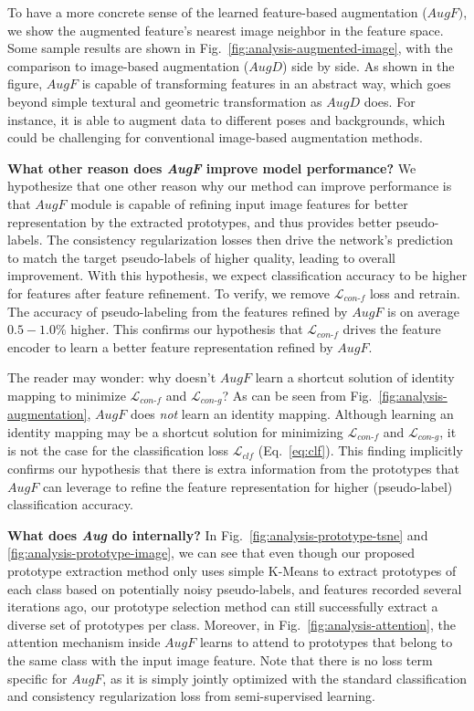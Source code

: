 \documentclass[runningheads]{llncs}
\begin{document}
To have a more concrete sense of the learned feature-based augmentation ($AugF)$, we show the augmented feature's nearest image neighbor in the feature space.
Some sample results are shown in Fig.~\ref{fig:analysis-augmented-image}, with the comparison to image-based augmentation ($AugD$) side by side.
As shown in the figure, $AugF$ is capable of transforming features in an abstract way, which goes beyond simple textural and geometric transformation as $AugD$ does.
For instance, it is able to augment data to different poses and backgrounds, which could be challenging for conventional image-based augmentation methods.

\noindent
\textbf{What other reason does \textit{AugF} improve model performance?}
We hypothesize that one other reason why our method can improve performance is that $AugF$ module is capable of refining input image features for better representation by the extracted prototypes, and thus provides better pseudo-labels.
The consistency regularization losses then drive the network's prediction to match the target pseudo-labels of higher quality, leading to overall improvement.
With this hypothesis, we expect classification accuracy to be higher for features after feature refinement.
To verify, we remove $\mathcal{L}_{con\text{-}f}$ loss and retrain.
The accuracy of pseudo-labeling from the features refined by $AugF$ is on average $0.5-1.0 \%$ higher.
This confirms our hypothesis that $\mathcal{L}_{con\text{-}f}$ drives the feature encoder to learn a better feature representation refined by $AugF$.

The reader may wonder: why doesn't $AugF$ learn a shortcut solution of identity mapping to minimize $\mathcal{L}_{con\text{-}f}$ and $\mathcal{L}_{con\text{-}g}$?
As can be seen from Fig.~\ref{fig:analysis-augmentation}, $AugF$ does \emph{not} learn an identity mapping.
Although learning an identity mapping may be a shortcut solution for minimizing $\mathcal{L}_{con\text{-}f}$ and $\mathcal{L}_{con\text{-}g}$, it is not the case for the classification loss $\mathcal{L}_{clf}$ (Eq.~\ref{eq:clf}).
This finding implicitly confirms our hypothesis that there is extra information from the prototypes that $AugF$ can leverage to refine the feature representation for higher (pseudo-label) classification accuracy.

\noindent
\textbf{What does \textit{Aug} do internally?}
In Fig.~\ref{fig:analysis-prototype-tsne} and \ref{fig:analysis-prototype-image}, we can see that even though our proposed prototype extraction method only uses simple K-Means to extract prototypes of each class based on potentially noisy pseudo-labels, and features recorded several iterations ago, our prototype selection method can still successfully extract a diverse set of prototypes per class.
Moreover, in Fig.~\ref{fig:analysis-attention}, the attention mechanism inside $AugF$ learns to attend to prototypes that belong to the same class with the input image feature.
Note that there is no loss term specific for $AugF$, as it is simply jointly optimized with the standard classification and consistency regularization loss from semi-supervised learning.
\end{document}
